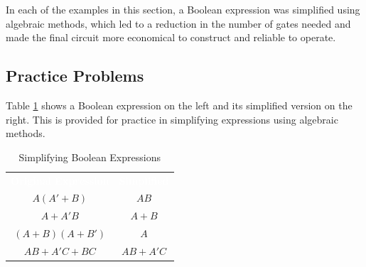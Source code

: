 In each of the examples in this section, a Boolean expression was simplified using algebraic methods, which led to a reduction in the number of gates needed and made the final circuit more economical to construct and reliable to operate. 

\subsection{Practice Problems}
\label{05:subsec:practice_problems_for_simplifying_with_algebra}

Table \ref{05:tab:simplifying_boolean_expressions} shows a Boolean expression on the left and its simplified version on the right. This is provided for practice in simplifying expressions using algebraic methods. 

\begin{table}[H]
  \sffamily
  \newcommand{\head}[1]{\textcolor{white}{\textbf{#1}}}    
  \begin{center}
    \begin{tabular}{cc}
      \rowcolor{black!75}
      \head{Original Expression} & \head{Simplified} \\
      $ A(A'+B) $ & $ AB $ \\
      $ A+A'B $ & $ A+B $ \\
      $ (A+B)(A+B') $ & $ A $ \\
      $ AB+A'C+BC $ & $ AB+A'C $ \\
    \end{tabular}
  \end{center}
  \caption{Simplifying Boolean Expressions}
  \label{05:tab:simplifying_boolean_expressions}
\end{table}